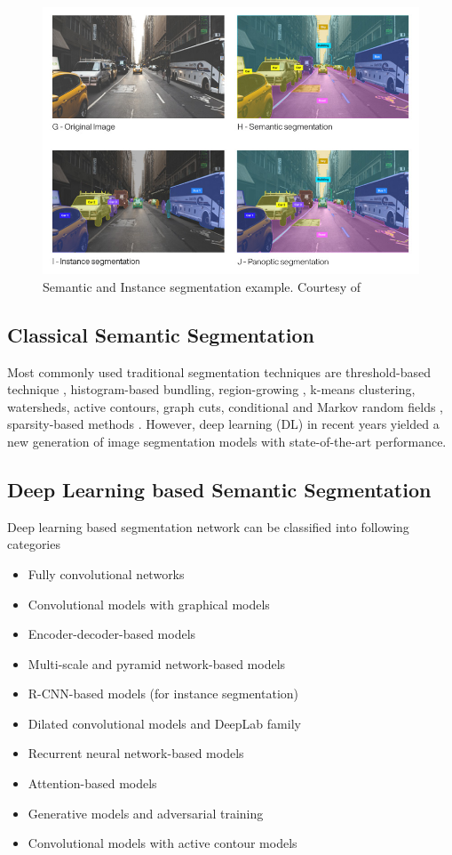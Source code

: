     \begin{figure}[h]
    	\centering
    	\includegraphics[width=12cm]{images/ss.jpg}
    	\caption{Semantic and Instance segmentation example. Courtesy of \cite{55_WinNT}}
    	\label{fig:SS}
    \end{figure}
    
    \subsection{Classical Semantic Segmentation}
    
	 Most commonly used traditional segmentation techniques are threshold-based technique \cite{56_otsu1979threshold}, histogram-based bundling, region-growing \cite{57_otsu1979threshold}, k-means clustering, watersheds, active contours, graph cuts, conditional and Markov random fields \cite{58_boykov2001fast}, sparsity-based methods \cite{59_starck2005image}. However, deep learning (DL) in recent years yielded a new generation of image segmentation models with state-of-the-art performance. 
    
    \subsection{Deep Learning based  Semantic Segmentation}
    
    Deep learning based segmentation network can be classified into following categories \cite{60_minaee2021image}
    
    \begin{itemize}
		\item Fully convolutional networks
		\item Convolutional models with graphical models
		\item Encoder-decoder-based models
		\item Multi-scale and pyramid network-based models
		\item R-CNN-based models (for instance segmentation)
		\item Dilated convolutional models and DeepLab family
		\item Recurrent neural network-based models
		\item Attention-based models
		\item Generative models and adversarial training
		\item Convolutional models with active contour models
	\end{itemize}
    
